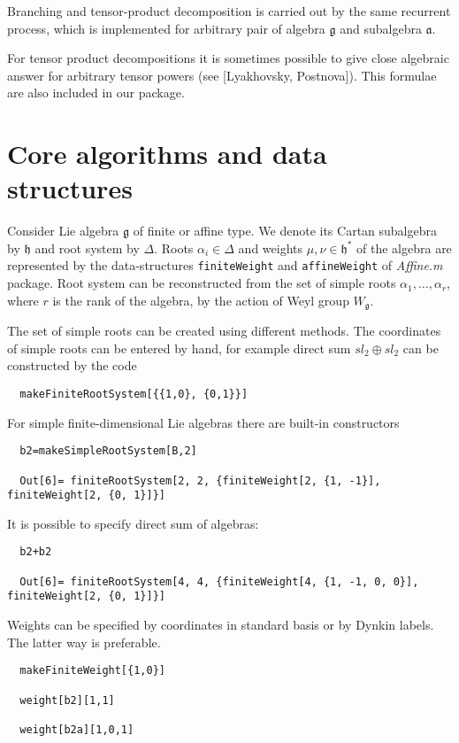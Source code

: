 \documentclass[12pt]{article}
\theoremstyle{definition}
\newcommand{\gf}{\mathfrak{g}}
\newcommand{\af}{\mathfrak{a}}
\newcommand{\hf}{\mathfrak{h}}
\begin{document}
Branching and tensor-product decomposition is carried out by the same recurrent process, which is implemented for arbitrary pair of algebra $\gf$ and subalgebra $\af$. 

For tensor product decompositions it is sometimes possible to give close algebraic answer for arbitrary tensor powers (see [Lyakhovsky, Postnova]). This formulae are also included in our package.

\section{Core algorithms and data structures}
\label{sec:core-algorithms}

Consider Lie algebra $\gf$ of finite or affine type. We denote its Cartan subalgebra by $\hf$ and root system by $\Delta$. Roots $\alpha_i\in \Delta$ and weights $\mu,\nu\in \hf^*$ of the algebra are represented by the data-structures \lstinline{finiteWeight} and \lstinline{affineWeight} of {\it Affine.m} package. 
Root system can be reconstructed from the set of simple roots $\alpha_{1}, \dots, \alpha_{r}$, where $r$ is the rank of the algebra, by the action of Weyl group $W_{\gf}$.  

The set of simple roots can be created using different methods. The coordinates of simple roots can be entered by hand, for example direct sum $sl_{2}\oplus sl_{2}$ can be constructed by the code
\begin{lstlisting}
  makeFiniteRootSystem[{{1,0}, {0,1}}]
\end{lstlisting}
For simple finite-dimensional Lie algebras there are built-in constructors
\begin{lstlisting}
  b2=makeSimpleRootSystem[B,2]

  Out[6]= finiteRootSystem[2, 2, {finiteWeight[2, {1, -1}], finiteWeight[2, {0, 1}]}]
\end{lstlisting}

It is possible to specify direct sum of algebras:
\begin{lstlisting}
  b2+b2

  Out[6]= finiteRootSystem[4, 4, {finiteWeight[4, {1, -1, 0, 0}], finiteWeight[2, {0, 1}]}]
\end{lstlisting}

Weights can be specified by coordinates in standard basis or by Dynkin labels. The latter way is preferable. 
\begin{lstlisting}
  makeFiniteWeight[{1,0}]

  weight[b2][1,1]

  weight[b2a][1,0,1]
\end{lstlisting}
\end{document}
